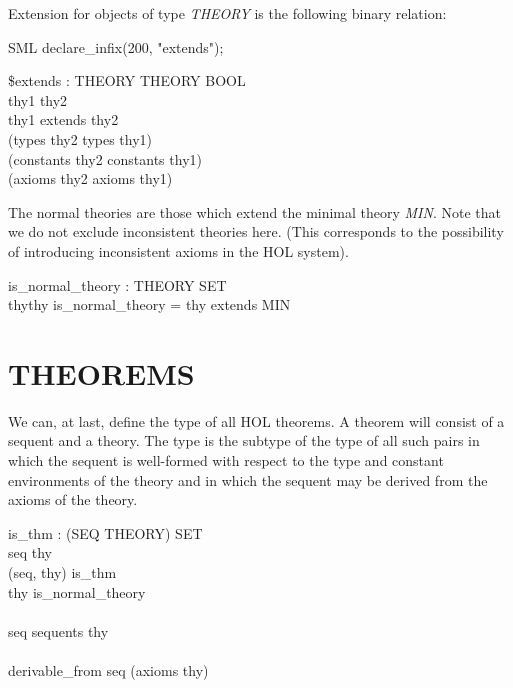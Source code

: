 \documentclass[a4paper,11pt,titlepage]{article}
\begin{document}
\begin{titlepage}
Extension for objects of type {\it THEORY} is
the following binary relation:

\begin{GFT}{SML}
\+declare\_infix(200, "extends");\\
\end{GFT}
\begin{HOLConst}
\+	\$\PrNL{}extends\PrNN{} : THEORY \MMM{\rightarrow} THEORY \MMM{\rightarrow} BOOL\\
\PrPH{}
\+	\MMM{\forall} thy1 thy2\MMM{\bullet}\\
\+	thy1 extends thy2 \MMM{\Leftrightarrow}\\
\+	(types thy2 \MMM{\subseteq} types thy1) \MMM{\land}\\
\+	(constants thy2 \MMM{\subseteq} constants thy1) \MMM{\land}\\
\+	(axioms thy2 \MMM{\subseteq} axioms thy1)\\
\end{HOLConst}
The normal theories are those which extend the
minimal theory {\it MIN}. Note that we do not
exclude inconsistent theories here. (This corresponds
to the possibility of introducing inconsistent axioms
in the HOL system).

\begin{HOLConst}
\+	\PrNL{}is\_normal\_theory\PrNN{} : THEORY SET\\
\PrPH{}
\+	\MMM{\forall}thy\MMM{\bullet}thy \MMM{\in} is\_normal\_theory = thy extends MIN\\
\end{HOLConst}




\section{THEOREMS}
\label{THEOREMS}

We can, at last, define the type of all HOL theorems.
A theorem will consist of a sequent and a theory.
The type is the subtype of the type of all such  pairs
in which the sequent is well-formed with respect to the
type and constant environments of the theory and in which
the sequent may be derived from the axioms of the theory.

\begin{HOLConst}
\+	\PrNL{}is\_thm\PrNN{}	: (SEQ \MMM{\times} THEORY) SET\\
\PrPH{}\PrPM{}\PrPM{}\PrPM{}\PrPM{}\PrPM{}\PrPM{}\PrPM{}\PrPM{}\PrPM{}\PrPM{}\PrPM{}\PrPM{}
\+	\MMM{\forall}seq thy\MMM{\bullet}\\
\+	(seq, thy) \MMM{\in} is\_thm \MMM{\Leftrightarrow}\\
\+	thy \MMM{\in} is\_normal\_theory\\
\+	\MMM{\land}\\
\+	seq \MMM{\in} sequents thy\\
\+	\MMM{\land}\\
\+	derivable\_from seq (axioms thy)\\
\end{HOLConst}


\end{titlepage}
\end{document}
